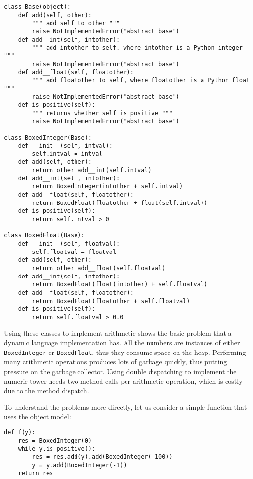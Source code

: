 \documentclass{sigplanconf}
\begin{document}
\begin{verbatim}
class Base(object):
    def add(self, other):
        """ add self to other """
        raise NotImplementedError("abstract base")
    def add__int(self, intother):
        """ add intother to self, where intother is a Python integer """
        raise NotImplementedError("abstract base")
    def add__float(self, floatother):
        """ add floatother to self, where floatother is a Python float """
        raise NotImplementedError("abstract base")
    def is_positive(self):
        """ returns whether self is positive """
        raise NotImplementedError("abstract base")

class BoxedInteger(Base):
    def __init__(self, intval):
        self.intval = intval
    def add(self, other):
        return other.add__int(self.intval)
    def add__int(self, intother):
        return BoxedInteger(intother + self.intval)
    def add__float(self, floatother):
        return BoxedFloat(floatother + float(self.intval))
    def is_positive(self):
        return self.intval > 0

class BoxedFloat(Base):
    def __init__(self, floatval):
        self.floatval = floatval
    def add(self, other):
        return other.add__float(self.floatval)
    def add__int(self, intother):
        return BoxedFloat(float(intother) + self.floatval)
    def add__float(self, floatother):
        return BoxedFloat(floatother + self.floatval)
    def is_positive(self):
        return self.floatval > 0.0
\end{verbatim}

Using these classes to implement arithmetic shows the basic problem that a
dynamic language implementation has. All the numbers are instances of either
\texttt{BoxedInteger} or \texttt{BoxedFloat}, thus they consume space on the
heap. Performing many arithmetic operations produces lots of garbage quickly,
thus putting pressure on the garbage collector. Using double dispatching to
implement the numeric tower needs two method calls per arithmetic operation,
which is costly due to the method dispatch.

To understand the problems more directly, let us consider a simple function
that uses the object model:

\begin{verbatim}
def f(y):
    res = BoxedInteger(0)
    while y.is_positive():
        res = res.add(y).add(BoxedInteger(-100))
        y = y.add(BoxedInteger(-1))
    return res
\end{verbatim}
\end{document}
